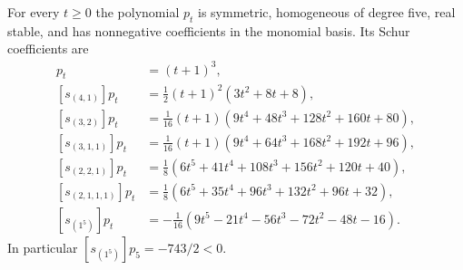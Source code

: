 \begin{proposition}\label{prop:aim36-family}
For every $t\ge0$ the polynomial $p_t$ is symmetric, homogeneous of degree five,
real stable, and has nonnegative coefficients in the monomial basis.  Its Schur
coefficients are
\begin{align*}
[s_{(5)}]p_t&=(t+1)^3,\\
[s_{(4,1)}]p_t&=\tfrac12(t+1)^2(3t^2+8t+8),\\
[s_{(3,2)}]p_t&=\tfrac1{16}(t+1)(9t^4+48t^3+128t^2+160t+80),\\
[s_{(3,1,1)}]p_t&=\tfrac1{16}(t+1)(9t^4+64t^3+168t^2+192t+96),\\
[s_{(2,2,1)}]p_t&=\tfrac18(6t^5+41t^4+108t^3+156t^2+120t+40),\\
[s_{(2,1,1,1)}]p_t&=\tfrac18(6t^5+35t^4+96t^3+132t^2+96t+32),\\
[s_{(1^5)}]p_t&=-\tfrac1{16}(9t^5-21t^4-56t^3-72t^2-48t-16).
\end{align*}
In particular $[s_{(1^5)}]p_5=-743/2<0$.
\end{proposition}

